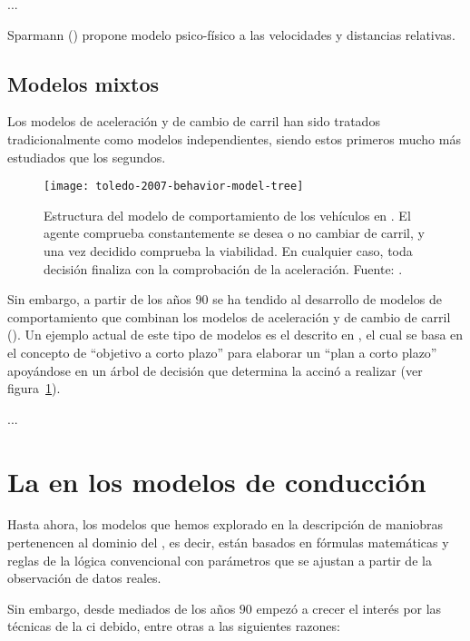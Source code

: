...

Sparmann (\cite{Sparmann1978}) propone modelo psico-físico a las velocidades y distancias relativas.

\subsection{Modelos mixtos}

Los modelos de aceleración y de cambio de carril han sido tratados tradicionalmente como modelos independientes, siendo estos primeros mucho más estudiados que los segundos.

\begin{figure}
	\texttt{[image: toledo-2007-behavior-model-tree]}
	\caption{Estructura del modelo de comportamiento de los vehículos en \cite{Toledo2007}. El agente comprueba constantemente se desea o no cambiar de carril, y una vez decidido comprueba la viabilidad. En cualquier caso, toda decisión finaliza con la comprobación de la aceleración. Fuente: \cite{Toledo2007}.}
	\label{fig:toledo-2007-behavior-model-tree}
\end{figure}

Sin embargo, a partir de los años $90$ se ha tendido al desarrollo de modelos de comportamiento que combinan los modelos de aceleración y de cambio de carril (\cite{Ma2004}). Un ejemplo actual de este tipo de modelos es el descrito en \cite{Toledo2007}, el cual se basa en el concepto de \enquote{objetivo a corto plazo} para elaborar un \enquote{plan a corto plazo} apoyándose en un árbol de decisión que determina la accinó a realizar (ver figura~\ref{fig:toledo-2007-behavior-model-tree}).

...

\section{La  en los modelos de conducción}

Hasta ahora, los modelos que hemos explorado en la descripción de maniobras pertenencen al dominio del  , es decir, están basados en fórmulas matemáticas y reglas de la lógica convencional con parámetros que se ajustan a partir de la observación de datos reales.

Sin embargo, desde mediados de los años $90$ empezó a crecer el interés por las técnicas de la \gls{ci} debido, entre otras a las siguientes razones:

